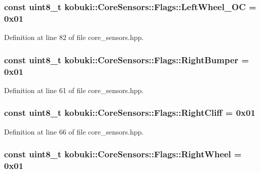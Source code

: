 \subsubsection[{\-Left\-Wheel\-\_\-\-O\-C}]{\setlength{\rightskip}{0pt plus 5cm}const uint8\-\_\-t {\bf kobuki\-::\-Core\-Sensors\-::\-Flags\-::\-Left\-Wheel\-\_\-\-O\-C} = 0x01\hspace{0.3cm}{\ttfamily  [static]}}\label{structkobuki_1_1CoreSensors_1_1Flags_a18f5b7c46447fa7a5661290ef052a863}


\-Definition at line 82 of file core\-\_\-sensors.\-hpp.

\subsubsection[{\-Right\-Bumper}]{\setlength{\rightskip}{0pt plus 5cm}const uint8\-\_\-t {\bf kobuki\-::\-Core\-Sensors\-::\-Flags\-::\-Right\-Bumper} = 0x01\hspace{0.3cm}{\ttfamily  [static]}}\label{structkobuki_1_1CoreSensors_1_1Flags_a46a0af0ca751224ee77ca8229dee8d74}


\-Definition at line 61 of file core\-\_\-sensors.\-hpp.

\subsubsection[{\-Right\-Cliff}]{\setlength{\rightskip}{0pt plus 5cm}const uint8\-\_\-t {\bf kobuki\-::\-Core\-Sensors\-::\-Flags\-::\-Right\-Cliff} = 0x01\hspace{0.3cm}{\ttfamily  [static]}}\label{structkobuki_1_1CoreSensors_1_1Flags_a26c8b51ff04d0aa820b11362cde089a9}


\-Definition at line 66 of file core\-\_\-sensors.\-hpp.

\subsubsection[{\-Right\-Wheel}]{\setlength{\rightskip}{0pt plus 5cm}const uint8\-\_\-t {\bf kobuki\-::\-Core\-Sensors\-::\-Flags\-::\-Right\-Wheel} = 0x01\hspace{0.3cm}{\ttfamily  [static]}}\label{structkobuki_1_1CoreSensors_1_1Flags_adcbe63546742933ef4f2e60ba2ba206b}


